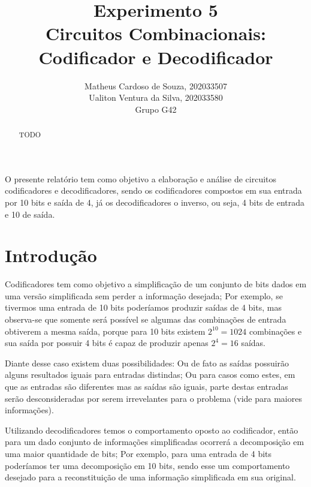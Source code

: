 \documentclass[12pt]{article}
\title{Experimento 5\\
Circuitos Combinacionais: Codificador e Decodificador}
\author{Matheus Cardoso de Souza, 202033507\\
        Ualiton Ventura da Silva, 202033580\\
        Grupo G42
}
\begin{document}
\maketitle

 \begin{abstract}
   TODO
 \end{abstract}

 \begin{resumo}
   O presente relatório tem como objetivo a elaboração e análise de circuitos
   codificadores e decodificadores, sendo os codificadores compostos em sua
   entrada por 10 bits e saída de 4, já os decodificadores o inverso, ou seja, 4
   bits de entrada e 10 de saída.
 \end{resumo}


\section{Introdução}
\label{sec:Introducao}


Codificadores tem como objetivo a simplificação de um conjunto de bits dados em
uma versão simplificada sem perder a informação desejada; Por exemplo, se
tivermos uma entrada de 10 bits poderíamos produzir saídas de 4 bits, mas
observa-se que somente será possível se algumas das combinações de entrada
obtiverem a mesma saída, porque para 10 bits existem $2^{10} = 1024$ combinações
e sua saída por possuir 4 bits é capaz de produzir apenas $2^{4} = 16$ saídas.
\cite{codificadores_mandelli}

Diante desse caso existem duas possibilidades: Ou de fato as saídas possuirão
alguns resultados iguais para entradas distindas; Ou para casos como estes, em
que as entradas são diferentes mas as saídas são iguais, parte destas entradas
serão desconsideradas por serem irrevelantes para o problema (vide
\cite{codificadores_e_decodificadores} para maiores informações).

Utilizando decodificadores temos o comportamento oposto ao codificador, então
para um dado conjunto de informações simplificadas ocorrerá a decomposição em
uma maior quantidade de bits; Por exemplo, para uma entrada de 4 bits poderíamos
ter uma decomposição em 10 bits, sendo esse um comportamento desejado para a
reconstituição de uma informação simplificada em sua original.
\end{document}
